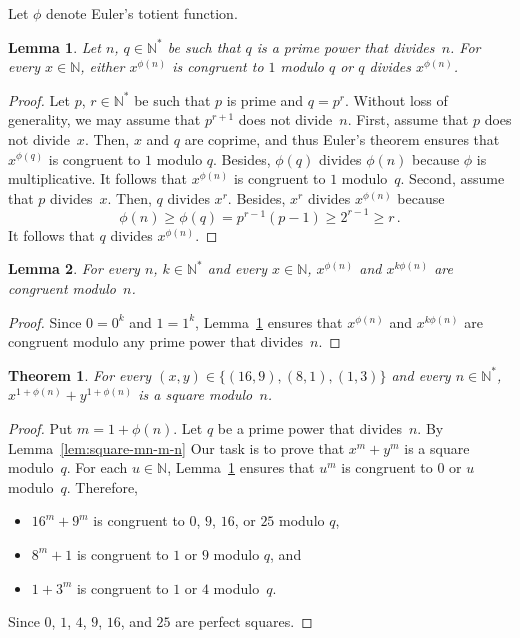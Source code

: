 \documentclass[12pt]{article}
\newcommand{\bZ}{\mathbb{Z}}
\newcommand{\bN}{\mathbb{N}} %
\newcommand{\bNast}{\bN^*}
\newtheorem{theorem}{Theorem}
\newtheorem{lemma}{Lemma}
\theoremstyle{definition}
\begin{document}
  Let $\phi$ denote Euler's totient function.

  \begin{lemma} \label{lem:Euler-0-or-1}
    Let $n$, $q \in \bNast$ be such that $q$ is a prime power that divides~$n$.
     For every $x \in \bN$, either $x^{\phi(n)}$ is congruent to $1$ modulo $q$ or $q$ divides $x^{\phi(n)}$.
  \end{lemma}

  \begin{proof}
    Let $p$, $r \in \bNast$ be such that $p$ is prime and $q = p^r$.
    Without loss of generality, we may assume that $p^{r + 1}$ does not divide~$n$.
    First, assume that $p$ does not divide~$x$.
    Then, $x$ and $q$ are coprime,
    and thus Euler's theorem ensures that $x^{\phi(q)}$ is congruent to $1$ modulo $q$.
    Besides, $\phi(q)$ divides $\phi(n)$ because $\phi$ is multiplicative.
    It follows that $x^{\phi(n)}$ is congruent to $1$ modulo~$q$.
    Second, assume that $p$ divides~$x$.
    Then, $q$ divides $x^r$.
    Besides, $x^r$ divides $x^{\phi(n)}$ because
    $$
    \phi(n) \ge \phi(q) = p^{r - 1} (p - 1) \ge 2^{r - 1} \ge r \,.
    $$
    It follows that $q$ divides $x^{\phi(n)}$.
\end{proof} 

\begin{lemma} \label{lem:Euler-k-phi}
  For every $n$, $k \in \bNast$ and every $x \in \bN$,
  $x^{\phi(n)}$ and $x^{k \phi(n)}$ are congruent modulo~$n$.
\end{lemma}

\begin{proof}
  Since $0 = 0^k$ and $1 = 1^k$,
  Lemma~\ref{lem:Euler-0-or-1} ensures that 
  $x^{\phi(n)}$ and $x^{k \phi(n)}$ are congruent modulo any prime power that divides~$n$.
\end{proof}


   \begin{theorem}
    For every $(x, y) \in \{ (16, 9), (8, 1), (1, 3) \}$ and every $n \in \bNast$, 
    $x^{1 + \phi(n)} + y^{1 + \phi(n)}$ is a square modulo~$n$. 
  \end{theorem}

  \begin{proof}
    Put $m = 1 + \phi(n)$.
    Let $q$ be a prime power that divides~$n$.
    By Lemma~\ref{lem:square-mn-m-n}
    Our task is to prove that $x^m + y^m$ is a square modulo~$q$.
    For each $u \in \bN$, 
    Lemma~\ref{lem:Euler-0-or-1} ensures that $u^m$ is congruent to $0$ or $u$ modulo~$q$.
    Therefore, 
    \begin{itemize}
      \item $16^m + 9^m$ is congruent to $0$, $9$, $16$, or $25$ modulo $q$,
      \item $8^m + 1$ is congruent to $1$ or $9$ modulo $q$, and 
      \item $1 + 3^m$ is congruent to $1$ or $4$ modulo~$q$.
      \end{itemize}
    Since $0$, $1$, $4$, $9$, $16$, and $25$ are perfect squares.
    \end{proof}
\end{document}
